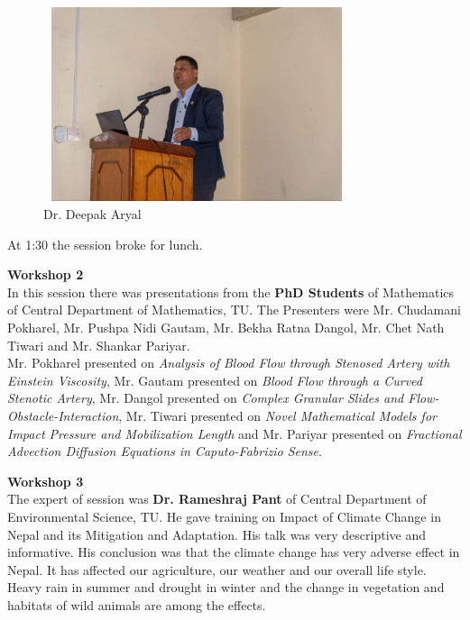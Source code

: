 \documentclass[a4paper,12pt]{report}
\begin{document}
\begin{figure}[h!]
  \centering
  \includegraphics[width=9cm, height=5.7cm]{deepak.jpeg}
  \caption{Dr. Deepak Aryal}
\end{figure}

At 1:30 the session broke for lunch.\\

\vspace{5mm}

{\bfseries \large Workshop 2}\\[3mm]
In this session there was presentations from the \textbf{PhD Students} of Mathematics of Central Department of Mathematics, TU. The Presenters were Mr. Chudamani Pokharel, Mr. Pushpa Nidi Gautam, Mr. Bekha Ratna Dangol, Mr. Chet Nath Tiwari and Mr. Shankar Pariyar.\\[3mm]
Mr. Pokharel presented on \textit{Analysis of Blood Flow through Stenosed Artery with Einstein Viscosity}, Mr. Gautam presented on \textit{Blood Flow through a Curved Stenotic Artery}, Mr. Dangol presented on \textit{Complex Granular Slides and Flow-Obstacle-Interaction}, Mr. Tiwari presented on \textit{Novel Mathematical Models for Impact Pressure and Mobilization Length} and Mr. Pariyar presented on \textit{Fractional Advection Diffusion Equations in Caputo-Fabrizio Sense}.
\clearpage

{\bfseries \large Workshop 3}\\[3mm]
The expert of session was \textbf{Dr. Rameshraj Pant} of Central Department of Environmental Science, TU. He gave training on Impact of Climate Change in Nepal and its Mitigation and Adaptation. His talk was very descriptive and informative. His conclusion was that the climate change has very adverse effect in Nepal. It has affected our agriculture, our weather and our overall life style. Heavy rain in summer and drought in winter and the change in vegetation and habitats of wild animals are among the effects.
\vspace{5mm}
\end{document}
